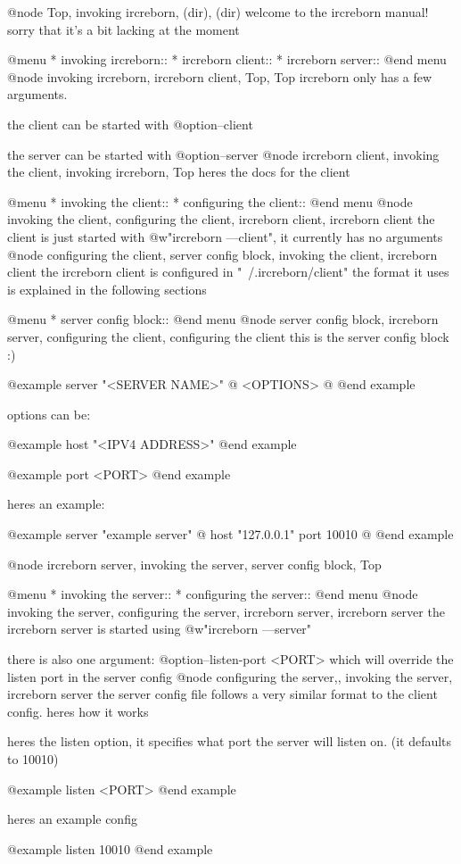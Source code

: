 
@node Top, invoking ircreborn, (dir), (dir)
welcome to the ircreborn manual! sorry that it's a bit lacking at the moment

@menu
* invoking ircreborn::
* ircreborn client::
* ircreborn server::
@end menu
@node invoking ircreborn, ircreborn client, Top, Top
ircreborn only has a few arguments.

the client can be started with @option{--client}

the server can be started with @option{--server}
@node ircreborn client, invoking the client, invoking ircreborn, Top
heres the docs for the client

@menu
* invoking the client::
* configuring the client::
@end menu
@node invoking the client, configuring the client, ircreborn client, ircreborn client
the client is just started with @w{"ircreborn ---client"}, it currently has no arguments
@node configuring the client, server config block, invoking the client, ircreborn client
the ircreborn client is configured in "~/.ircreborn/client"
the format it uses is explained in the following sections

@menu
* server config block::
@end menu
@node server config block, ircreborn server, configuring the client, configuring the client
this is the server config block :)

@example
server "<SERVER NAME>" @{
    <OPTIONS>
@}
@end example

options can be:

@example
host "<IPV4 ADDRESS>"
@end example

@example
port <PORT>
@end example

heres an example:

@example
server "example server" @{
    host "127.0.0.1"
    port 10010
@}
@end example

@node ircreborn server, invoking the server, server config block, Top

@menu
* invoking the server::
* configuring the server::
@end menu
@node invoking the server, configuring the server, ircreborn server, ircreborn server
the ircreborn server is started using @w{"ircreborn ---server"}

there is also one argument: @option{--listen-port <PORT>} which will override the listen port in the server config
@node configuring the server,, invoking the server, ircreborn server
the server config file follows a very similar format to the client config. heres how it works

heres the listen option, it specifies what port the server will listen on. (it defaults to 10010)

@example
listen <PORT>
@end example

heres an example config

@example
listen 10010
@end example